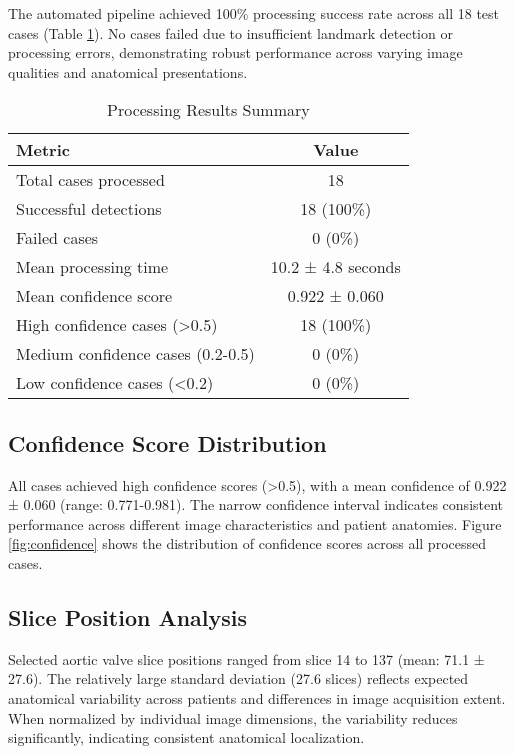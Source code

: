 \documentclass[11pt,a4paper]{article}
\begin{document}
The automated pipeline achieved 100\% processing success rate across all 18 test cases (Table \ref{tab:results}). No cases failed due to insufficient landmark detection or processing errors, demonstrating robust performance across varying image qualities and anatomical presentations.

\begin{table}[ht]
\centering
\caption{Processing Results Summary}
\label{tab:results}
\begin{tabular}{@{}lc@{}}
\toprule
Metric & Value \\
\midrule
Total cases processed & 18 \\
Successful detections & 18 (100\%) \\
Failed cases & 0 (0\%) \\
Mean processing time & 10.2 ± 4.8 seconds \\
Mean confidence score & 0.922 ± 0.060 \\
High confidence cases (>0.5) & 18 (100\%) \\
Medium confidence cases (0.2-0.5) & 0 (0\%) \\
Low confidence cases (<0.2) & 0 (0\%) \\
\bottomrule
\end{tabular}
\end{table}

\subsection{Confidence Score Distribution}

All cases achieved high confidence scores (>0.5), with a mean confidence of 0.922 ± 0.060 (range: 0.771-0.981). The narrow confidence interval indicates consistent performance across different image characteristics and patient anatomies. Figure \ref{fig:confidence} shows the distribution of confidence scores across all processed cases.

\subsection{Slice Position Analysis}

Selected aortic valve slice positions ranged from slice 14 to 137 (mean: 71.1 ± 27.6). The relatively large standard deviation (27.6 slices) reflects expected anatomical variability across patients and differences in image acquisition extent. When normalized by individual image dimensions, the variability reduces significantly, indicating consistent anatomical localization.
\end{document}
